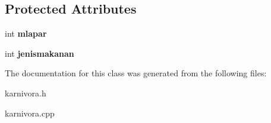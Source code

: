 \subsection*{Protected Attributes}
\begin{DoxyCompactItemize}
\item 
int {\bfseries mlapar}\hypertarget{classkarnivora_a0b48304fede2005274cf787d765107d3}{}\label{classkarnivora_a0b48304fede2005274cf787d765107d3}

\item 
int {\bfseries jenismakanan}\hypertarget{classkarnivora_a21c9dcfc494dcd1bad9edd3facc7cecb}{}\label{classkarnivora_a21c9dcfc494dcd1bad9edd3facc7cecb}

\end{DoxyCompactItemize}


The documentation for this class was generated from the following files\+:\begin{DoxyCompactItemize}
\item 
karnivora.\+h\item 
karnivora.\+cpp\end{DoxyCompactItemize}
